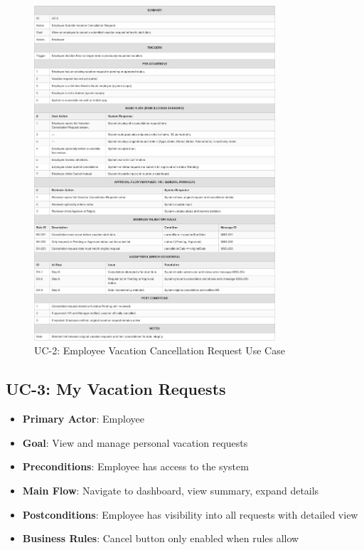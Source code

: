 \documentclass[12pt,a4paper]{article}
\begin{document}
\begin{figure}[H]
\centering
\includegraphics[width=0.8\textwidth]{Use-Cases/UC-2-Employee-Vacation-Cancellation-Request/UC-2-Employee-Vacation-Cancellation-Request-1.png}
\caption{UC-2: Employee Vacation Cancellation Request Use Case}
\label{fig:uc2}
\end{figure}

\subsection{UC-3: My Vacation Requests}
\begin{itemize}
    \item \textbf{Primary Actor}: Employee
    \item \textbf{Goal}: View and manage personal vacation requests
    \item \textbf{Preconditions}: Employee has access to the system
    \item \textbf{Main Flow}: Navigate to dashboard, view summary, expand details
    \item \textbf{Postconditions}: Employee has visibility into all requests with detailed view
    \item \textbf{Business Rules}: Cancel button only enabled when rules allow
\end{itemize}
\end{document}
